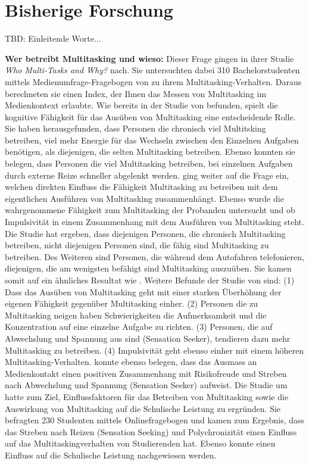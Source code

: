 \section{Bisherige Forschung}\label{section.bisherigeForschung}
TBD: Einleitende Worte...
\par
\textbf{Wer betreibt Multitasking und wieso:} Dieser Frage gingen  in ihrer Studie \textit{Who Multi-Tasks and Why?} nach. Sie untersuchten dabei 310 Bachelorstudenten mittels Medienumfrage-Fragebogen von  zu ihrem Multitasking-Verhalten. Daraus berechneten sie einen Index, der Ihnen das Messen von Multitasking im Medienkontext erlaubte. Wie bereits in der Studie von  befunden, spielt die kognitive Fähigkeit für das Ausüben von Multitasking eine entscheidende Rolle. Sie haben herausgefunden, dass Personen die chronisch viel Multitsking betreiben, viel mehr Energie für das Wechseln zwischen den Einzelnen Aufgaben benötigen, als diejenigen, die selten Multitasking betreiben. Ebenso konnten sie belegen, dass Personen die viel Multitasking betreiben, bei einzelnen Aufgaben durch externe Reize schneller abgelenkt werden.  ging weiter auf die Frage ein, welchen direkten Einfluss die Fähigkeit Multitasking zu betreiben mit dem eigentlichen Ausführen von Multitasking zusammenhängt. 
Ebenso wurde die wahrgenommene Fähigkeit zum Multitasking der Probanden untersucht und ob Impulsivität in einem Zusammenhang mit dem Ausführen von Multitasking steht. Die Studie hat ergeben, dass diejenigen Personen, die chronisch Multitasking betreiben, nicht diejenigen Personen sind, die fähig sind Multitasking zu betreiben. Des Weiteren sind Personen, die während dem Autofahren telefonieren, diejenigen, die am wenigsten befähigt sind Multitasking auszuüben. Sie kamen somit auf ein ähnliches Resultat wie . Weitere Befunde der Studie von  sind: (1) Dass das Ausüben von Multitasking geht mit einer starken Überhöhung der eigenen Fähigkeit gegenüber Multitasking einher. (2) Personen die zu Multitasking neigen haben Schwierigkeiten die Aufmerksamkeit und die Konzentration auf eine einzelne Aufgabe zu richten. (3) Personen, die auf Abwechslung und Spannung aus sind (Sensation Seeker), tendieren dazu mehr Multitasking zu betreiben. (4) Impulsivität geht ebenso einher mit einem höheren Multitasking-Verhalten.  konnte ebenso belegen, dass das Ausmass an Medienkontakt einen positiven Zusammenhang mit Risikofreude und Streben nach Abwechslung und Spannung (Sensation Seeker) aufweist. Die Studie um  hatte zum Ziel, Einflussfaktoren für das Betreiben von Multitasking sowie die Auswirkung von Multitasking auf die Schulische Leistung zu ergründen. Sie befragten 230 Studenten mittels Onlinefragebogen und kamen zum Ergebnis, dass das Streben nach Reizen (Sensation Seeking) und Polychronizität einen Einfluss auf das Multitaskingverhalten von Studierenden hat. Ebenso konnte einen Einfluss auf die Schulische Leistung nachgewiesen werden.
